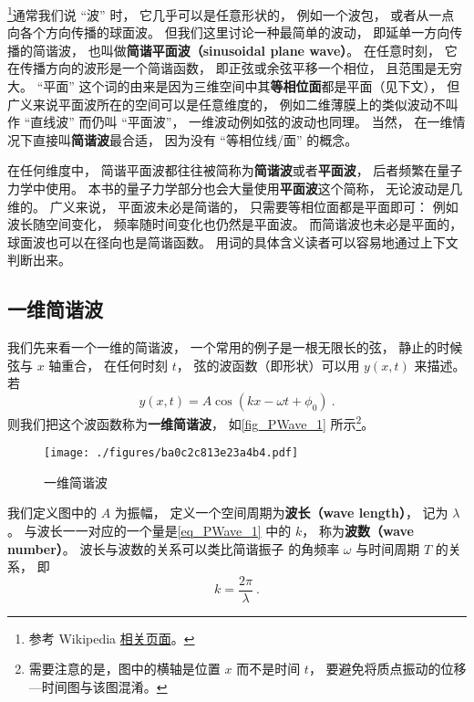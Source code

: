 
\footnote{参考 Wikipedia \href{https://en.wikipedia.org/wiki/Plane_wave}{相关页面}。}通常我们说 “波” 时， 它几乎可以是任意形状的， 例如一个波包， 或者从一点向各个方向传播的球面波。 但我们这里讨论一种最简单的波动， 即延单一方向传播的简谐波， 也叫做\textbf{简谐平面波（sinusoidal plane wave）}。 在任意时刻， 它在传播方向的波形是一个简谐函数， 即正弦或余弦平移一个相位， 且范围是无穷大。 “平面” 这个词的由来是因为三维空间中其\textbf{等相位面}都是平面（见下文）， 但广义来说平面波所在的空间可以是任意维度的， 例如二维薄膜上的类似波动不叫作 “直线波” 而仍叫 “平面波”， 一维波动例如弦的波动也同理。 当然， 在一维情况下直接叫\textbf{简谐波}最合适， 因为没有 “等相位线/面” 的概念。

在任何维度中， 简谐平面波都往往被简称为\textbf{简谐波}或者\textbf{平面波}， 后者频繁在量子力学中使用。 本书的量子力学部分也会大量使用\textbf{平面波}这个简称， 无论波动是几维的。 广义来说， 平面波未必是简谐的， 只需要等相位面都是平面即可： 例如波长随空间变化， 频率随时间变化也仍然是平面波。 而简谐波也未必是平面的， 球面波也可以在径向也是简谐函数。 用词的具体含义读者可以容易地通过上下文判断出来。

\subsection{一维简谐波}
我们先来看一个一维的简谐波， 一个常用的例子是一根无限长的弦， 静止的时候弦与 $x$ 轴重合， 在任何时刻 $t$， 弦的波函数（即形状）可以用 $y(x, t)$ 来描述。 若
\begin{equation}\label{eq_PWave_1}
y(x, t) = A\cos(k x - \omega t + \phi_0)~.
\end{equation}
则我们把这个波函数称为\textbf{一维简谐波}， 如\autoref{fig_PWave_1} 所示\footnote{需要注意的是，图中的横轴是位置 $x$ 而不是时间 $t$， 要避免将质点振动的位移—时间图与该图混淆。}。

\begin{figure}[ht]
\centering
\texttt{[image: ./figures/ba0c2c813e23a4b4.pdf]}
\caption{一维简谐波} \label{fig_PWave_1}
\end{figure}

我们定义图中的 $A$ 为振幅， 定义一个空间周期为\textbf{波长（wave length）}， 记为 $\lambda$。 与波长一一对应的一个量是\autoref{eq_PWave_1} 中的 $k$， 称为\textbf{波数（wave number）}。 波长与波数的关系可以类比简谐振子 的角频率 $\omega$ 与时间周期 $T$ 的关系， 即
\begin{equation}\label{eq_PWave_2}
k = \frac{2\pi}{\lambda}~.
\end{equation}

